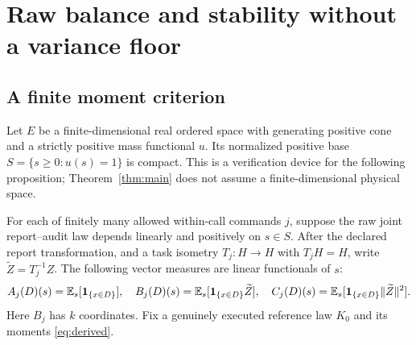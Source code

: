 \section{Raw balance and stability without a variance floor}
\subsection*{A finite moment criterion}
Let $E$ be a finite-dimensional real ordered space with generating positive cone and a strictly positive mass functional $u$. Its normalized positive base $S=\{s\ge0:u(s)=1\}$ is compact. This is a verification device for the following proposition; Theorem~\ref{thm:main} does not assume a finite-dimensional physical space.

For each of finitely many allowed within-call commands $j$, suppose the raw joint report--audit law depends linearly and positively on $s\in S$. After the declared report transformation, and a task isometry $T_j:H\to H$ with $T_jH=H$, write $\widetilde Z=T_j^{-1}Z$. The following vector measures are linear functionals of $s$:
\[
 A_j(D)(s)=\mathbb E_s[\mathbf1_{\{x\in D\}}],\quad
 B_j(D)(s)=\mathbb E_s[\mathbf1_{\{x\in D\}}\widetilde Z],\quad
 C_j(D)(s)=\mathbb E_s[\mathbf1_{\{x\in D\}}\|\widetilde Z\|^2].
\]
Here $B_j$ has $k$ coordinates. Fix a genuinely executed reference law $K_0$ and its moments \eqref{eq:derived}.

